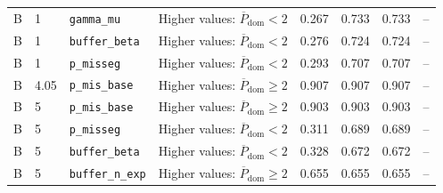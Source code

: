 \begin{table}[!htbp]
{\begin{tabular}{@{}llllrrrr@{}}
B & 1 & \texttt{gamma\_mu} & Higher values: $\overline P_{\mathrm{dom}}<2$ & 0.267 & 0.733 & 0.733 & -- \\
B & 1 & \texttt{buffer\_beta} & Higher values: $\overline P_{\mathrm{dom}}<2$ & 0.276 & 0.724 & 0.724 & -- \\
B & 1 & \texttt{p\_misseg} & Higher values: $\overline P_{\mathrm{dom}}<2$ & 0.293 & 0.707 & 0.707 & -- \\
B & 4.05 & \texttt{p\_mis\_base} & Higher values: $\overline P_{\mathrm{dom}}\geq2$ & 0.907 & 0.907 & 0.907 & -- \\
B & 5 & \texttt{p\_mis\_base} & Higher values: $\overline P_{\mathrm{dom}}\geq2$ & 0.903 & 0.903 & 0.903 & -- \\
B & 5 & \texttt{p\_misseg} & Higher values: $\overline P_{\mathrm{dom}}<2$ & 0.311 & 0.689 & 0.689 & -- \\
B & 5 & \texttt{buffer\_beta} & Higher values: $\overline P_{\mathrm{dom}}<2$ & 0.328 & 0.672 & 0.672 & -- \\
B & 5 & \texttt{buffer\_n\_exp} & Higher values: $\overline P_{\mathrm{dom}}\geq2$ & 0.655 & 0.655 & 0.655 & -- \\
\bottomrule
\end{tabular}%
}
\par\vspace{0.7em}
\par\vspace{0.5em}

\end{table}
